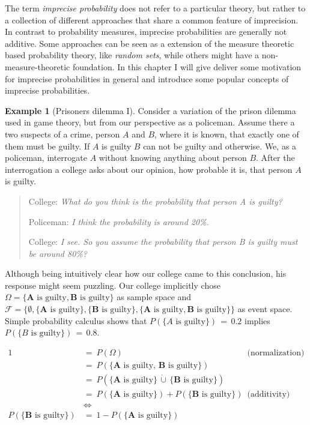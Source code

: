 \documentclass[
]{report}
\theoremstyle{definition}
\theoremstyle{definition}
\newtheorem{example}{Example}[section]
\begin{document}
The term \textit{imprecise probability} does not refer to a particular
theory, but rather to a collection of different approaches that share a
common feature of imprecision. In contrast to probability measures,
imprecise probabilities are generally not additive. Some approaches can
be seen as a extension of the measure theoretic based probability
theory, like \textit{random sets}, while others might have a
non-measure-theoretic foundation. In this chapter I will give deliver
some motivation for imprecise probabilities in general and introduce
some popular concepts of imprecise probabilities.

\begin{example}[Prisoners dilemma I]\label{ex:prisoners1}
Consider a variation of the prison dilemma used in game theory, but from our perspective as a policeman. Assume there a two suspects of a crime, person $A$ and $B$, where it is known, that exactly one of them must be guilty. If $A$ is guilty $B$ can not be guilty and otherwise. We, as a policeman, interrogate $A$ without knowing anything about person $B$. After the interrogation a college asks about our opinion, how probable it is, that person $A$ is guilty.

\begin{quote}
College: \textit{What do you think is the probability that person A is guilty?} \par
Policeman: \textit{I think the probability is around 20\%.} \par
College: \textit{I see. So you assume the probability that person B is guilty must be around 80\%?}
\end{quote}

Although being intuitively clear how our college came to this conclusion, his response might seem puzzling. Our college implicitly chose $\Omega = \{\mathbf{A} \text{ is guilty}, \mathbf{B} \text{ is guilty} \}$ as sample space and $\mathcal{F} = \{ \emptyset, \{ \mathbf{A} \text{ is guilty} \}, \{ \mathbf{B} \text{ is guilty} \}, \{ \mathbf{A} \text{ is guilty}, \mathbf{B} \text{ is guilty} \} \}$ as event space. Simple probability calculus shows that $P(\{A \text{ is guilty}\}) \, = \, 0.2$ implies $P(\{B \text{ is guilty}\}) \, = \,  0.8$.

\begin{align*}
1 \ &= \ P(\Omega) & \text{(normalization)}\\
  &= \ P(\{\mathbf{A} \text{ is guilty}, \, \mathbf{B} \text{ is guilty}\}) \\
  &= \ P(\{\mathbf{A} \text{ is guilty}\} \, \dot\cup \, \{\mathbf{B} \text{ is guilty}\}) & \text{}\\
  &= \ P(\{\mathbf{A} \text{ is guilty}\}) + P(\{\mathbf{B} \text{ is guilty}\}) & \text{(additivity)}\\
  & \Leftrightarrow \\
P(\{\mathbf{B} \text{ is guilty}\}) \ &= \ 1 - P(\{\mathbf{A} \text{ is guilty}\})
\end{align*}



\end{example}
\end{document}
